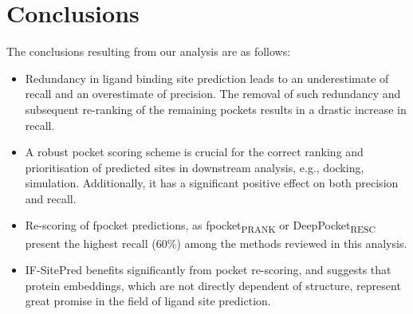 \section{Conclusions}

The conclusions resulting from our analysis are as follows:

\begin{itemize}

\item Redundancy in ligand binding site prediction leads to an underestimate of recall and an overestimate of precision. The removal of such redundancy and subsequent re-ranking of the remaining pockets results in a drastic increase in recall.

\item A robust pocket scoring scheme is crucial for the correct ranking and prioritisation of predicted sites in downstream analysis, e.g., docking, simulation. Additionally, it has a significant positive effect on both precision and recall.

\item Re-scoring of fpocket predictions, as fpocket\textsubscript{PRANK} or DeepPocket\textsubscript{RESC} present the highest recall (60\%) among the methods reviewed in this analysis.

\item IF-SitePred benefits significantly from pocket re-scoring, and suggests that protein embeddings, which are not directly dependent of structure, represent great promise in the field of ligand site prediction.

\end{itemize}

